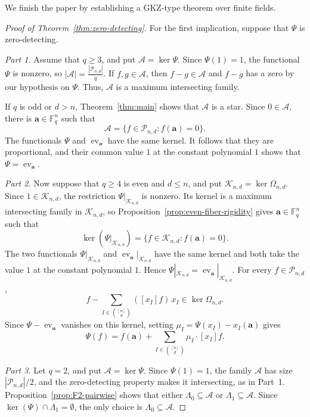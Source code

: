 \documentclass[12pt,reqno]{amsart}
\theoremstyle{definition}
\newcommand{\F}{\mathbb{F}}
\newcommand{\cA}{\mathcal A}
\newcommand{\cP}{\mathcal P}
\begin{document}
We finish the paper by establishing a GKZ-type theorem over finite fields.

\begin{proof}[Proof of Theorem~\ref{thm:zero-detecting}]
For the first implication, suppose that $\Psi$ is zero-detecting.

\emph{Part 1.} Assume that $q\geq 3$, and put $\cA=\ker\Psi$. Since $\Psi(1)=1$, the functional $\Psi$ is nonzero, so $|\cA|=\frac{|\cP_{n,d}|}{q}$. If $f,g\in\cA$, then $f-g\in\cA$ and $f-g$ has a zero by our hypothesis on $\Psi$. Thus, $\cA$ is a maximum intersecting family.

If $q$ is odd or $d>n$, Theorem~\ref{thm:main} shows that $\cA$ is a
star. Since $0\in\cA$, there is $\mathbf a\in\F_q^n$ such that
\[
  \cA=\{f\in\cP_{n,d}:f(\mathbf a)=0\}.
\]
The functionals $\Psi$ and $\operatorname{ev}_{\mathbf a}$ have the
same kernel. It follows that they are proportional, and their common value $1$ at the constant polynomial $1$ shows that $ \Psi=\operatorname{ev}_{\mathbf a}$.

\emph{Part 2.} Now suppose that $q\geq4$ is even and $d\leq n$, and put $\mathcal K_{n,d}=\ker\Omega_{n,d}$. Since $1\in\mathcal K_{n,d}$, the restriction $\Psi|_{\mathcal K_{n,d}}$ is nonzero. Its kernel is a maximum intersecting family in $\mathcal K_{n,d}$, so Proposition~\ref{prop:even-fiber-rigidity} gives $\mathbf a\in\F_q^n$ such that
\[
  \ker(\Psi|_{\mathcal K_{n,d}})
  =\{f\in\mathcal K_{n,d}:f(\mathbf a)=0\}.
\]
The two functionals $\Psi|_{\mathcal K_{n,d}}$ and  $\operatorname{ev}_{\mathbf a}|_{\mathcal K_{n,d}}$ have the same kernel and both take the value $1$ at the constant
polynomial $1$. Hence $\Psi|_{\mathcal K_{n,d}}=\operatorname{ev}_{\mathbf a}|_{\mathcal K_{n,d}}$. For every $f\in\cP_{n,d}$,
\[
f-\sum_{I\in\binom{[n]}d}([x_I]f)\,x_I
\in\ker\Omega_{n,d}.
\]
Since
$\Psi-\operatorname{ev}_{\mathbf a}$ vanishes on this kernel, setting
$\mu_I=\Psi(x_I)-x_I(\mathbf a)$ gives
\[
  \Psi(f)
  =f(\mathbf a)
   +\sum_{I\in\binom{[n]}{d}}\mu_I\cdot[x_I]f.
\]

\emph{Part 3.} Let $q=2$, and put $\cA=\ker\Psi$. Since $\Psi(1)=1$,
the family $\cA$ has size $|\cP_{n,d}|/2$, and the zero-detecting
property makes it intersecting, as in Part~1. Proposition~\ref{prop:F2-pairwise}
shows that either $\Lambda_{0}\subseteq \cA$ or $\Lambda_{1}\subseteq \cA$. Since $\ker(\Psi)\cap \Lambda_{1}=\emptyset$, the only choice is $\Lambda_{0}\subseteq \cA$.


\end{proof}
\end{document}
